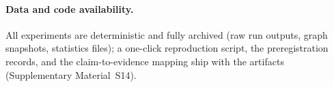 \documentclass[10pt,a4paper]{article}
\begin{document}
\paragraph{Data and code availability.} All experiments are deterministic and fully archived (raw run outputs, graph snapshots, statistics files); a one-click reproduction script, the preregistration records, and the claim-to-evidence mapping ship with the artifacts (Supplementary Material~S14).



\end{document}
